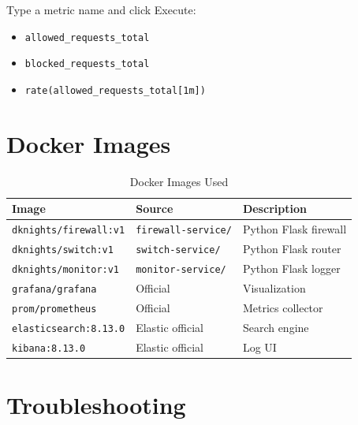\documentclass[12pt,a4paper]{article}
\begin{document}
Type a metric name and click Execute:
\begin{itemize}
    \item \texttt{allowed\_requests\_total}
    \item \texttt{blocked\_requests\_total}
    \item \texttt{rate(allowed\_requests\_total[1m])}
\end{itemize}

\section{Docker Images}

\begin{table}[h]
\centering
\begin{tabular}{@{}llp{5cm}@{}}
\toprule
\textbf{Image} & \textbf{Source} & \textbf{Description} \\
\midrule
\texttt{dknights/firewall:v1} & \texttt{firewall-service/} & Python Flask firewall \\
\texttt{dknights/switch:v1} & \texttt{switch-service/} & Python Flask router \\
\texttt{dknights/monitor:v1} & \texttt{monitor-service/} & Python Flask logger \\
\texttt{grafana/grafana} & Official & Visualization \\
\texttt{prom/prometheus} & Official & Metrics collector \\
\texttt{elasticsearch:8.13.0} & Elastic official & Search engine \\
\texttt{kibana:8.13.0} & Elastic official & Log UI \\
\bottomrule
\end{tabular}
\caption{Docker Images Used}
\end{table}

\section{Troubleshooting}
\end{document}
